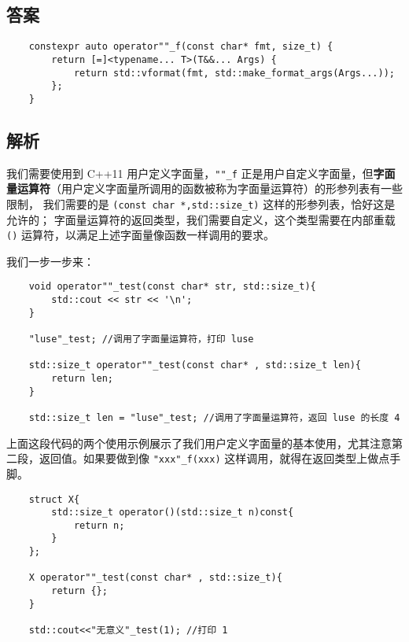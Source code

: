 

\subsection{答案}

\begin{verbatim}
    constexpr auto operator""_f(const char* fmt, size_t) {
        return [=]<typename... T>(T&&... Args) { 
            return std::vformat(fmt, std::make_format_args(Args...));
        };
    }
\end{verbatim}

\subsection{解析}


我们需要使用到 C++11 用户定义字面量，\texttt{""_f} 正是用户自定义字面量，但\textbf{字面量运算符}（用户定义字面量所调用的函数被称为字面量运算符）的形参列表有一些限制，
我们需要的是 \texttt{(const char *,std::size_t)} 这样的形参列表，恰好这是允许的；
字面量运算符的返回类型，我们需要自定义，这个类型需要在内部重载 \texttt{()} 运算符，以满足上述字面量像函数一样调用的要求。

我们一步一步来：

\begin{verbatim}
    void operator""_test(const char* str, std::size_t){
        std::cout << str << '\n';
    }
    
    "luse"_test; //调用了字面量运算符，打印 luse
    
    std::size_t operator""_test(const char* , std::size_t len){
        return len;
    }
    
    std::size_t len = "luse"_test; //调用了字面量运算符，返回 luse 的长度 4
\end{verbatim}

上面这段代码的两个使用示例展示了我们用户定义字面量的基本使用，尤其注意第二段，返回值。如果要做到像 \texttt{"xxx"_f(xxx)} 这样调用，就得在返回类型上做点手脚。

\begin{verbatim}
    struct X{
        std::size_t operator()(std::size_t n)const{
            return n;
        }
    };
    
    X operator""_test(const char* , std::size_t){
        return {};
    }
    
    std::cout<<"无意义"_test(1); //打印 1
\end{verbatim}

